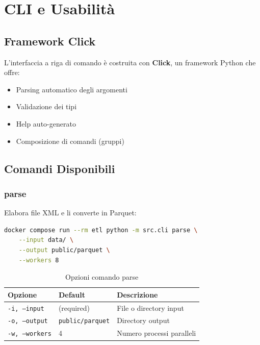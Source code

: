 \chapter{CLI e Usabilità}

\section{Framework Click}

L'interfaccia a riga di comando è costruita con \textbf{Click}, un framework Python che offre:

\begin{itemize}
    \item Parsing automatico degli argomenti
    \item Validazione dei tipi
    \item Help auto-generato
    \item Composizione di comandi (gruppi)
\end{itemize}

\section{Comandi Disponibili}

\subsection{parse}

Elabora file XML e li converte in Parquet:

\begin{lstlisting}[language=bash]
docker compose run --rm etl python -m src.cli parse \
    --input data/ \
    --output public/parquet \
    --workers 8
\end{lstlisting}

\begin{table}[h]
\centering
\begin{tabular}{@{}llp{5cm}@{}}
\toprule
\textbf{Opzione} & \textbf{Default} & \textbf{Descrizione} \\
\midrule
\texttt{-i, --input} & (required) & File o directory input \\
\texttt{-o, --output} & \texttt{public/parquet} & Directory output \\
\texttt{-w, --workers} & 4 & Numero processi paralleli \\
\bottomrule
\end{tabular}
\caption{Opzioni comando parse}
\end{table}

